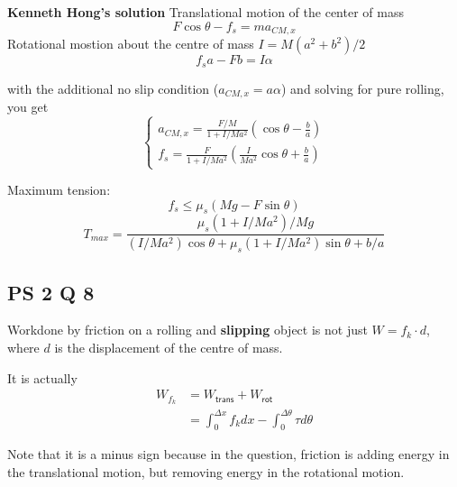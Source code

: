 \textbf{Kenneth Hong's solution}
Translational motion of the center of mass
\begin{equation}
    F \cos \theta - f_s= ma_{CM,x}
\end{equation}
Rotational mostion about the centre of mass $I=M(a^2+b^2)/2$
\begin{equation}
    f_s a - Fb=I\alpha
\end{equation}

with the additional no slip condition ($a_{CM,x}=a\alpha$) and solving for pure rolling, you get
\begin{equation}
    \begin{cases}
        a_{CM,x}=\frac{F/M}{1+I/Ma^2}(\cos\theta-\frac{b}{a})\\
        f_s=\frac{F}{1+I/Ma^2}(\frac{I}{Ma^2}\cos\theta+\frac{b}{a})
      \end{cases}
\end{equation}

Maximum tension:
\begin{equation}
    f_s \leq \mu_s (Mg-F \sin\theta)
\end{equation}
\begin{equation}
    T_{max}=\frac{\mu_s (1+I/Ma^2)/Mg}{(I/Ma^2)\cos\theta+\mu_s(1+I/Ma^2)\sin\theta+b/a}
\end{equation}

\subsection{PS 2 Q 8}

\indent Workdone by friction on a rolling and \textbf{slipping} object is not just $W=f_k \cdot d$, where $d$ is the displacement of the centre of mass.

It is actually
\begin{align}
    W_{f_k} 
    &= W_{\textsf{trans}}+W_{\textsf{rot}}\\
    &= \int_0^{\Delta x} f_k dx - \int_0^{\Delta \theta} \tau d \theta 
\end{align}

Note that it is a minus sign because in the question, friction is adding energy in the translational motion, but removing energy in the rotational motion. 

